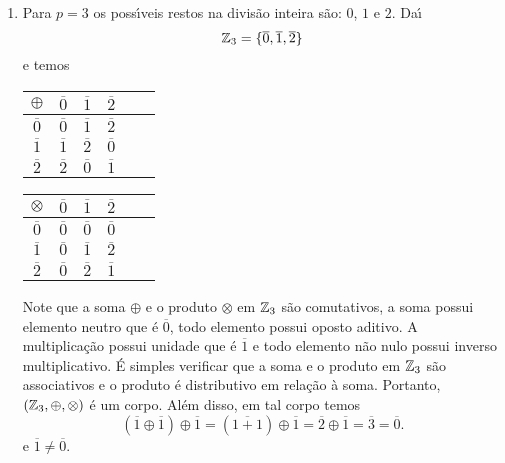 \begin{exemplos}
\begin{enumerate}
	\item Para $p = 3$ os poss{\'\i}veis restos na divis\~ao inteira s\~ao: $0$, $1$ e $2$. Da{\'\i}
		\[
			\mathbb{Z}_3 = \{\overline{0}, \overline{1}, \overline{2}\}
		\]
	e temos
	\begin{center}
		\begin{tabular}{|c|c|c|c|c|c|}
			\hline
			$\oplus$ & $\overline{0}$ & $\overline{1}$ & $\overline{2}$\\\hline
			$\overline{0}$ & $\overline{0}$ & $\overline{1}$ & $\overline{2}$\\\hline
			$\overline{1}$ & $\overline{1}$ & $\overline{2}$ & $\overline{0}$\\\hline
			$\overline{2}$ & $\overline{2}$ & $\overline{0}$ & $\overline{1}$\\\hline
			\end{tabular} \qquad \begin{tabular}{|c|c|c|c|c|c|}
			\hline
			$\otimes$ & $\overline{0}$ & $\overline{1}$ & $\overline{2}$\\\hline
			$\overline{0}$ & $\overline{0}$ & $\overline{0}$ & $\overline{0}$\\\hline
			$\overline{1}$ & $\overline{0}$ & $\overline{1}$ & $\overline{2}$\\\hline
			$\overline{2}$ & $\overline{0}$ & $\overline{2}$ & $\overline{1}$\\\hline
		\end{tabular}
	\end{center}
	Note que a soma $\oplus$ e o produto $\otimes$ em $\mathbb{Z}_3$ s\~ao comutativos, a soma possui elemento neutro que \'e $\overline{0}$, todo elemento possui
	oposto aditivo. A multiplica\c{c}\~ao possui unidade que \'e $\overline{1}$ e todo elemento n\~ao nulo possui inverso multiplicativo. \'E simples verificar que a soma e o produto em $\mathbb{Z}_3$ s\~ao associativos e o produto \'e distributivo em rela\c{c}\~ao \`a soma. Portanto, $(\mathbb{Z}_3, \oplus, \otimes)$ \'e um corpo. Al\'em disso, em tal corpo temos
	\[
		(\overline{1} \oplus \overline{1}) \oplus \overline{1} = (\overline{1 + 1}) \oplus \overline{1} = \overline{2} \oplus \overline{1} = \overline{3} = \overline{0}.
	\]
	e $\overline{1} \ne \overline{0}$.


\end{enumerate}
\end{exemplos}
